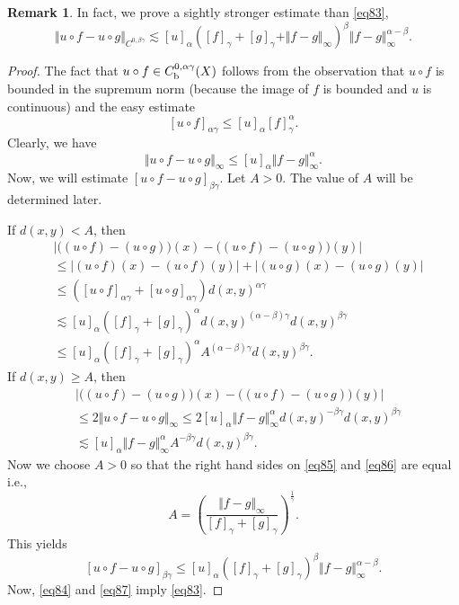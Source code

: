 \documentclass[intlimits,12pt,reqno]{amsart}
\numberwithin{equation}{section}
\theoremstyle{definition}
\newtheorem{remark}[theorem]{Remark}
\begin{document}
\begin{remark}
In fact, we prove a sightly stronger estimate than \eqref{eq83},
$$
\Vert u\circ f-u\circ g\Vert_{C^{0,\beta\gamma}}\lesssim
[u]_{\alpha}\left([f]_\gamma+[g]_\gamma+\Vert f-g\Vert_\infty\right)^{\beta}
\Vert f-g\Vert_\infty^{\alpha-\beta}.
$$
\end{remark}
\begin{proof}
The fact that $u\circ f\in C^{0,\alpha\gamma}_{\rm b}(X)$ follows from  the observation that $u\circ f$ is bounded in the supremum norm (because the image of $f$ is bounded and $u$ is continuous) and the easy estimate
$$
[u\circ f]_{\alpha\gamma}\leq
[u]_{\alpha}[f]_{\gamma}^\alpha.
$$
Clearly, we have
\begin{equation}
\label{eq84}
\Vert u\circ f- u\circ g\Vert_\infty\leq [u]_{\alpha}\Vert f-g\Vert_\infty^\alpha.
\end{equation}
Now, we will estimate $[u\circ f-u\circ g]_{\beta\gamma}$. Let $A>0$. The value of $A$ will be determined later.

If $d(x,y)<A$, then
\begin{equation}
\label{eq85}
\begin{split}
&
\big|\big((u\circ f)-(u\circ g)\big)(x)-\big((u\circ f)-(u\circ g)\big)(y)\big|\\
&\leq
|(u\circ f)(x)-(u\circ f)(y)|+|(u\circ g)(x)-(u\circ g)(y)|\\
&\leq
\left([u\circ f]_{\alpha\gamma}+[u\circ g]_{\alpha\gamma}\right)d(x,y)^{\alpha\gamma}\\
&\lesssim
[u]_{\alpha}\left([f]_{\gamma}+[g]_{\gamma}\right)^\alpha
d(x,y)^{(\alpha-\beta)\gamma}d(x,y)^{\beta\gamma}\\
&\leq
[u]_{\alpha}\left([f]_{\gamma}+[g]_{\gamma}\right)^\alpha
A^{(\alpha-\beta)\gamma}d(x,y)^{\beta\gamma}.
\end{split}
\end{equation}
If $d(x,y)\geq A$, then
\begin{equation}
\label{eq86}
\begin{split}
&
\big|\big((u\circ f)-(u\circ g)\big)(x)-\big((u\circ f)-(u\circ g)\big)(y)\big|\\
&\leq
2\Vert u\circ f-u\circ g\Vert_\infty\leq 2[u]_{\alpha}\Vert f-g\Vert_\infty^\alpha d(x,y)^{-\beta\gamma}d(x,y)^{\beta\gamma}\\
&\lesssim
[u]_{\alpha}\Vert f-g\Vert_\infty^\alpha A^{-\beta\gamma}d(x,y)^{\beta\gamma}.
\end{split}
\end{equation}
Now we choose $A>0$ so that the right hand sides on \eqref{eq85} and \eqref{eq86} are equal i.e., 
$$
A=\left(\frac{\Vert f-g\Vert_\infty}{[f]_{\gamma}+[g]_{\gamma}}\right)^{\frac{1}{\gamma}}.
$$
This yields
\begin{equation}
\label{eq87}
[u\circ f-u\circ g]_{\beta\gamma}\leq 
[u]_{\alpha} \left([f]_{\gamma}+[g]_{\gamma}\right)^{\beta}\Vert f-g\Vert_\infty^{\alpha-\beta}.
\end{equation}
Now, \eqref{eq84} and \eqref{eq87} imply \eqref{eq83}.
\end{proof}
\end{document}
